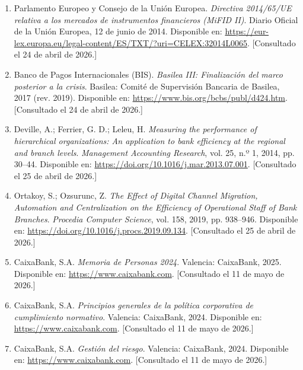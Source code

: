 \begin{enumerate}
  \item \label{ref:mifid}
    Parlamento Europeo y Consejo de la Unión Europea.
    \textit{Directiva 2014/65/UE relativa a los mercados de instrumentos financieros (MiFID II)}.
    Diario Oficial de la Unión Europea, 12 de junio de 2014.
    Disponible en: \url{https://eur-lex.europa.eu/legal-content/ES/TXT/?uri=CELEX:32014L0065}.
    [Consultado el 24 de abril de 2026.]

  \item \label{ref:basilea}
    Banco de Pagos Internacionales (BIS).
    \textit{Basilea III: Finalización del marco posterior a la crisis}.
    Basilea: Comité de Supervisión Bancaria de Basilea, 2017 (rev. 2019).
    Disponible en: \url{https://www.bis.org/bcbs/publ/d424.htm}.
    [Consultado el 24 de abril de 2026.]

  \item \label{ref:deville2014}
    Deville, A.; Ferrier, G. D.; Leleu, H.
    \textit{Measuring the performance of hierarchical organizations: An application to bank efficiency at the regional and branch levels}.
    \textit{Management Accounting Research}, vol. 25, n.º 1, 2014, pp. 30--44.
    Disponible en: \url{https://doi.org/10.1016/j.mar.2013.07.001}.
    [Consultado el 25 de abril de 2026.]

  \item \label{ref:ortakoy2019}
    Ortakoy, S.; Ozsurunc, Z.
    \textit{The Effect of Digital Channel Migration, Automation and Centralization on the Efficiency of Operational Staff of Bank Branches}.
    \textit{Procedia Computer Science}, vol. 158, 2019, pp. 938--946.
    Disponible en: \url{https://doi.org/10.1016/j.procs.2019.09.134}.
    [Consultado el 25 de abril de 2026.]



  \item \label{ref:memoria_personas}
    CaixaBank, S.A.
    \textit{Memoria de Personas 2024}.
    Valencia: CaixaBank, 2025.
    Disponible en: \url{https://www.caixabank.com}.
    [Consultado el 11 de mayo de 2026.]

  \item \label{ref:cx_cumplimiento}
    CaixaBank, S.A.
    \textit{Principios generales de la política corporativa de cumplimiento normativo}.
    Valencia: CaixaBank, 2024.
    Disponible en: \url{https://www.caixabank.com}.
    [Consultado el 11 de mayo de 2026.]

  \item \label{ref:cx_riesgo}
    CaixaBank, S.A.
    \textit{Gestión del riesgo}.
    Valencia: CaixaBank, 2024.
    Disponible en: \url{https://www.caixabank.com}.
    [Consultado el 11 de mayo de 2026.]


\end{enumerate}
